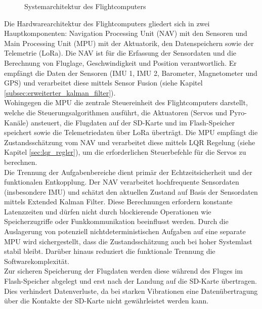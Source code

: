 \begin{figure}[H]
    
    \caption{Systemarchitektur des Flightcomputers}
    \label{fig:systemarchitektur}
\end{figure}
Die Hardwarearchitektur des Flightcomputers gliedert sich in zwei Hauptkomponenten: Navigation Processing Unit (NAV) mit den Sensoren und Main Processing Unit (MPU) mit der Aktuatorik, den Datenspeichern sowie der Telemetrie (LoRa). Die NAV ist für die Erfassung der Sensordaten und die Berechnung von Fluglage, Geschwindigkeit und Position verantwortlich. Er empfängt die Daten der Sensoren (IMU 1, IMU 2, Barometer, Magnetometer und GPS) und verarbeitet diese mittels Sensor Fusion (siehe Kapitel \ref{subsec:erweiterter_kalman_filter}).
\\
Wohingegen die MPU die zentrale Steuereinheit des Flightcomputers darstellt, welche die Steuerungsalgorithmen ausführt, die Aktuatoren (Servos und Pyro-Kanäle) ansteuert, die Flugdaten auf der SD-Karte und im Flash-Speicher speichert sowie die Telemetriedaten über LoRa überträgt. Die MPU empfängt die Zustandsschätzung vom NAV und verarbeitet diese mittels LQR Regelung (siehe Kapitel \ref{sec:lqr_regler}), um die erforderlichen Steuerbefehle für die Servos zu berechnen.
\\
Die Trennung der Aufgabenbereiche dient primär der Echtzeitsicherheit und der funktionalen Entkopplung. Der NAV verarbeitet hochfrequente Sensordaten (insbesondere IMU) und schätzt den aktuellen Zustand auf Basis der Sensordaten mittels Extended Kalman Filter. Diese Berechnungen erfordern konstante Latenzzeiten und dürfen nicht durch blockierende Operationen wie Speicherzugriffe oder Funkkommunikation beeinflusst werden. Durch die Auslagerung von potenziell nichtdeterministischen Aufgaben auf eine separate MPU wird sichergestellt, dass die Zustandsschätzung auch bei hoher Systemlast stabil bleibt. Darüber hinaus reduziert die funktionale Trennung die Softwarekomplexität.
\\ 
Zur sicheren Speicherung der Flugdaten werden diese während des Fluges im Flash-Speicher abgelegt und erst nach der Landung auf die SD-Karte übertragen. Dies verhindert Datenverluste, da bei starken Vibrationen eine Datenübertragung über die Kontakte der SD-Karte nicht gewährleistet werden kann.
